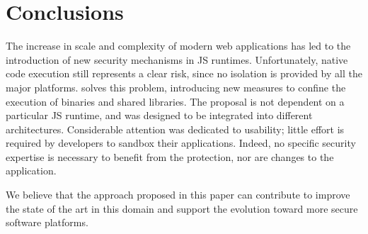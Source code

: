 \section{Conclusions}

The increase in scale and complexity of modern web applications has
led to the introduction of new security mechanisms in JS
runtimes. Unfortunately, native code execution still represents
a clear risk, since no isolation is provided by all the major
platforms. \pap solves this problem, introducing new measures to
confine the execution of binaries and shared libraries. The
proposal is not dependent on a particular JS runtime, and was designed
to be integrated into different architectures.  Considerable
attention was dedicated to usability; little effort is required by
developers to sandbox their applications. Indeed, no specific security
expertise is necessary to benefit from the protection, nor
are changes to the application.

We believe that the approach proposed in this paper can contribute to
improve the state of the art in this domain and support the evolution
toward more secure software platforms.

